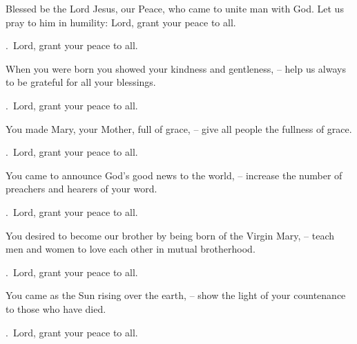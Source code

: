 \lettrine[loversize=0.15,lines=2]{B}{}lessed be the Lord Jesus, our Peace, who came to unite man with God. Let us pray to him in humility: Lord, grant your peace to all.
\par \Rbar.~Lord, grant your peace to all.

When you were born you showed your kindness and gentleness,
– help us always to be grateful for all your blessings.
\par \Rbar.~Lord, grant your peace to all.

You made Mary, your Mother, full of grace,
– give all people the fullness of grace.
\par \Rbar.~Lord, grant your peace to all.

You came to announce God’s good news to the world,
– increase the number of preachers and hearers of your word.
\par \Rbar.~Lord, grant your peace to all.

You desired to become our brother by being born of the Virgin Mary,
– teach men and women to love each other in mutual brotherhood.
\par \Rbar.~Lord, grant your peace to all.

You came as the Sun rising over the earth,
– show the light of your countenance to those who have died.
\par \Rbar.~Lord, grant your peace to all.
